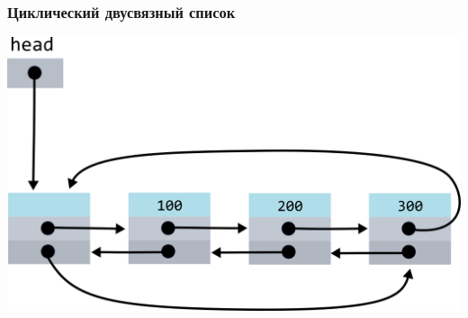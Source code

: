 \documentclass[10pt,pdf,hyperref={unicode}]{beamer}
\begin{document}
\begin{frame}[fragile]
\frametitle{Циклический двусвязный список}
\begin{center}
\includegraphics[width=\imageSizeMult\linewidth]{../images/doublylist/circular_list.png}
\end{center}
\end{frame}
\end{document}
